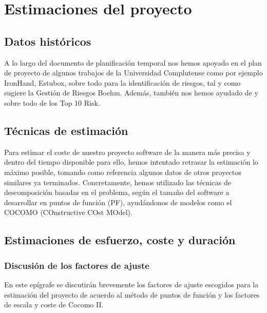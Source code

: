 \documentclass[11pt, a4paper, twoside]{report}
\begin{document}
	\section{Estimaciones del proyecto}
		\subsection{Datos históricos}
		A lo largo del documento de planificación temporal nos hemos apoyado en el plan de proyecto de algunos trabajos de la Universidad Complutense como por ejemplo IronHand, Estubox, sobre todo para la identificación de riesgos, tal y como sugiere la Gestión de Riesgos Boehm. Además, también nos hemos ayudado de \cite{PSMAN} y sobre todo de los Top 10 Risk.
		\subsection{Técnicas de estimación}
		Para estimar el coste de nuestro proyecto software de la manera más precisa y dentro del tiempo disponible para ello, hemos intentado retrasar la estimación lo máximo posible, tomando como referencia algunos datos de otros proyectos similares ya terminados. Concretamente, hemos utilizado las técnicas de descomposición basadas en el problema, según el tamaño del software a desarrollar en puntos de función (PF), ayudándonos de modelos como el COCOMO (COnstructive COst MOdel).
		\subsection{Estimaciones de esfuerzo, coste y duración}
			\subsubsection{Discusión de los factores de ajuste}
				En este epígrafe se discutirán brevemente los factores de ajuste escogidos para la estimación del proyecto de acuerdo al método de puntos de función y los factores de escala y coste de Cocomo II.
\end{document}
